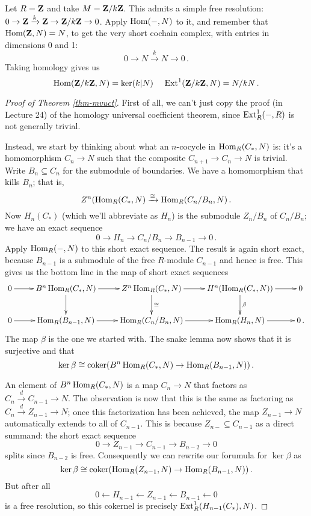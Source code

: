 \begin{example}
Let $R=\mathbf Z$ and take $M=\mathbf Z/k\mathbf Z$. This admits a simple free resolution:
$0\to \mathbf Z\xrightarrow{k}\mathbf Z\to\mathbf Z/k\mathbf Z\to 0$. Apply $\operatorname{Hom}(-,N)$ to it,
and remember that $\operatorname{Hom}(\mathbf Z,N)=N$, to get 
the very short cochain complex, with entries in dimensions 0 and 1:
\[
0\to N\xrightarrow{k} N\to0\,.
\]
Taking homology gives us
\[
\operatorname{Hom}(\mathbf Z/k\mathbf Z,N)=\ker(k|N)\,\quad\operatorname{Ext}^1(\mathbf Z/k\mathbf Z,N)=N/kN\,.
\]
\end{example}

\begin{proof}[Proof of Theorem \ref{thm-mvuct}]
First of all, we can't just copy the proof (in Lecture 24) of the
homology universal coefficient theorem, since $\operatorname{Ext}^1_R(-,R)$ is not
generally trivial. 

Instead, we start by thinking about what an $n$-cocycle in $\operatorname{Hom}_R(C_*,N)$ is:
it's a homomorphism $C_n\to N$ such that the composite $C_{n+1}\to C_n\to N$ 
is trivial. Write $B_n\subseteq C_n$ for the submodule of boundaries.
We have a homomorphism that kills $B_n$; that is,
\[
Z^n(\operatorname{Hom}_R(C_*,N)\xrightarrow{\cong}\operatorname{Hom}_R(C_n/B_n,N)\,.
\]
Now $H_n(C_*)$ (which we'll abbreviate as $H_n$) is the submodule
$Z_n/B_n$ of $C_n/B_n$; we have an exact sequence
\begin{equation*}
0\to H_n\to C_n/B_n\to B_{n-1}\to0\,.
\end{equation*}
Apply $\operatorname{Hom}_R(-,N)$ to this short exact sequence. The result is again 
short exact, because $B_{n-1}$ is a submodule of the free $R$-module $C_{n-1}$
and hence is free. This gives us the bottom line in the map of short
exact sequences
\[
\xymatrix{
0 \ar[r] & B^n\Hom_R(C_*,N) \ar[r] \ar[d] & 
Z^n\Hom_R(C_*,N) \ar[d]^\cong \ar[r]
& H^n(\Hom_R(C_*,N)) \ar[d]^\beta \ar[r] & 0\\
0 \ar[r] & \Hom_R(B_{n-1},N) \ar[r] & \Hom_R(C_n/B_n,N) \ar[r] & 
\Hom_R(H_n,N) \ar[r] & 0\,.
}\]
The map $\beta$ is the one we started with. The snake lemma
now shows that it is surjective and that
\[
\ker\beta\cong\operatorname{coker}(B^n\operatorname{Hom}_R(C_*,N)\to\operatorname{Hom}_R(B_{n-1},N))\,.
\]

An element of $B^n\operatorname{Hom}_R(C_*,N)$ is a map $C_n\to N$ that factors as
$C_n\xrightarrow{d}C_{n-1}\to N$. The observation is now that this is
the same as factoring as $C_n\xrightarrow{d}Z_{n-1}\to N$;
once this factorization has been achieved, the map $Z_{n-1}\to N$ 
automatically extends to all of $C_{n-1}$. This is because  
$Z_{n-}\subseteq C_{n-1}$ as a direct summand: the short exact sequence 
\[
0\to Z_{n-1}\to C_{n-1}\to B_{n-2}\to0
\]
splits since $B_{n-2}$ is free. Consequently we can rewrite our forumula for
$\ker\beta$ as 
\[
\ker\beta\cong\operatorname{coker}(\operatorname{Hom}_R(Z_{n-1},N)\to\operatorname{Hom}_R(B_{n-1},N))\,.
\]
But after all 
\[
0\leftarrow H_{n-1}\leftarrow Z_{n-1}\leftarrow B_{n-1}\leftarrow0
\]
is a free resolution, so this cokernel is precisely 
$\operatorname{Ext}_R^1(H_{n-1}(C_*),N)$.
\end{proof}

